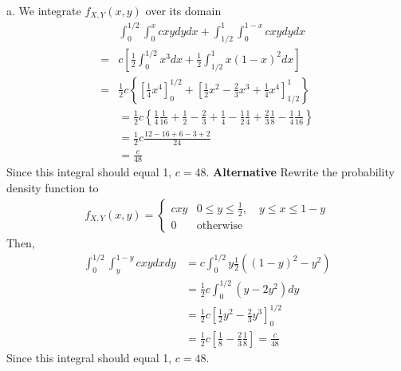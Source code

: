 \begin{exercise}
 \begin{solution}
a.         We integrate $f_{X,Y}(x,y)$ over its domain
        \begin{align*}
            &\int_{0}^{1/2}\int_{0}^{x}cxydydx + \int_{1/2}^{1}\int_{0}^{1-x}cxydydx\\
            = &c\left[\frac{1}{2}\int_{0}^{1/2}x^3dx + \frac{1}{2}\int_{1/2}^{1}x(1-x)^2dx\right]\\
            =&\frac{1}{2}c\left\{\left[\frac{1}{4}x^4\right]^{1/2}_{0} + \left[\frac{1}{2}x^2-\frac{2}{3}x^{3}+\frac{1}{4}x^{4}\right]^{1}_{1/2}\right\}\\
            & = \frac{1}{2}c\left\{\frac{1}{4}\frac{1}{16} + \frac{1}{2}-\frac{2}{3}+\frac{1}{4}-\frac{1}{2}\frac{1}{4} + \frac{2}{3}\frac{1}{8} - \frac{1}{4}\frac{1}{16}\right\}\\
            & = \frac{1}{2}c\frac{12-16+6-3+2}{24}\\
            & = \frac{c}{48}
        \end{align*}
        Since this integral should equal 1, $c = 48$. \newline\newline
        \textbf{Alternative} Rewrite the probability density function to
        \begin{align*}
            f_{X,Y}(x,y) = \left\{\begin{array}{ll}
                cxy & 0\leq y\leq \frac{1}{2},\quad y\leq x\leq 1-y\\
                0 & \text{otherwise}
            \end{array}\right.
        \end{align*}
        Then,
        \begin{align*}
            \int_{0}^{1/2}\int_{y}^{1-y}cxydxdy& = c\int_{0}^{1/2}y\frac{1}{2}\left((1-y)^2-y^2\right)\\
            & = \frac{1}{2}c\int_{0}^{1/2}\left( y-2y^2\right)dy\\
            &=\frac{1}{2}c\left[\frac{1}{2}y^2-\frac{2}{3}y^3\right]_{0}^{1/2}\\
            &=\frac{1}{2}c\left[ \frac{1}{8}-\frac{2}{3}\frac{1}{8}\right]
            =\frac{c}{48}
        \end{align*}
        Since this integral should equal 1, $c = 48$.



\end{solution}
\end{exercise}
